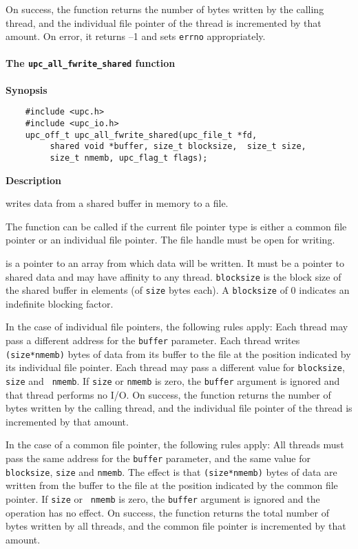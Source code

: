\np On success, the function returns the number of bytes written by the
calling thread, and the individual file pointer of the thread is incremented by
that amount. On error, it returns --1 and sets {\tt errno} appropriately.

\paragraph{The {\tt upc\_all\_fwrite\_shared} function}

{\bf Synopsis}

\npf\vspace{-2.5em}
\begin{verbatim}
    #include <upc.h>
    #include <upc_io.h>
    upc_off_t upc_all_fwrite_shared(upc_file_t *fd, 
         shared void *buffer, size_t blocksize,  size_t size,
         size_t nmemb, upc_flag_t flags);
\end{verbatim}

{\bf Description}

 writes data from a shared buffer in memory to a
file.

\np The function can be called if the current file pointer type is either a
common file pointer or an individual file pointer. The file handle must be open
for writing. 

 is a pointer to an array from which data will be written. It must
be a pointer to shared data and may have affinity to any thread. {\tt blocksize}
is the block size of the shared buffer in elements (of {\tt size} bytes each).
A {\tt blocksize} of 0 indicates an indefinite blocking factor.

\np In the case of individual file pointers, the following rules apply: Each
thread may pass a different address for the {\tt buffer} parameter. 
Each thread writes {\tt (size*nmemb)} bytes of data from its buffer to the
file at the position indicated by its individual file pointer.
Each thread may pass a different value for {\tt blocksize}, {\tt size} and {\tt 
nmemb}. If {\tt size} or {\tt nmemb} is zero, the {\tt buffer} argument is
ignored and that thread performs no I/O.  On success, the function returns the
number of bytes written by the calling thread, and the individual file pointer of
the thread is incremented by that amount.

\np In the case of a common file pointer, the following rules apply: All
threads must pass the same address for the {\tt buffer} parameter, and the 
same value for {\tt blocksize}, {\tt size} and {\tt nmemb}. The effect is that 
{\tt (size*nmemb)} bytes of data are written from the buffer to the file at
the position indicated by the common file pointer.  If {\tt size} or {\tt
nmemb} is zero, the {\tt buffer} argument is ignored and the operation has no
effect.  On success, the function returns the total number of bytes written by all
threads, and the common file pointer is incremented by that amount.

